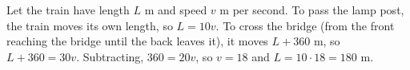 Let the train have length $L$ m and speed $v$ m per second. To pass the lamp post, the train moves its own length, so $L=10v$. To cross the bridge (from the front reaching the bridge until the back leaves it), it moves $L+360$ m, so $L+360=30v$. Subtracting, $360=20v$, so $v=18$ and $L=10\cdot18=\boxed{180}$ m.
